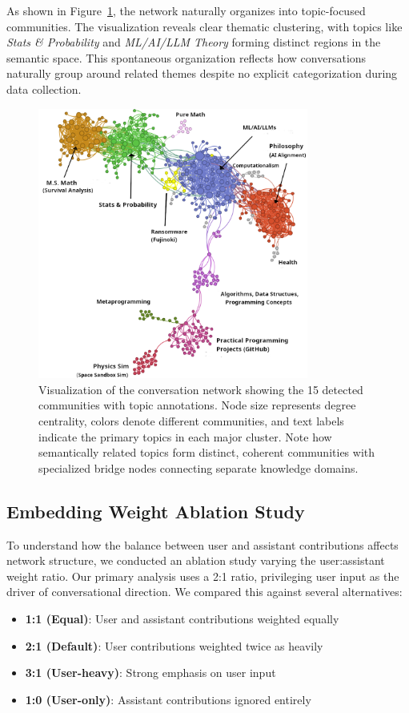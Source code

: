 \documentclass[10pt, a4paper]{article}
\begin{document}
As shown in Figure~\ref{fig:network_vis}, the network naturally organizes into topic-focused communities. The visualization reveals clear thematic clustering, with topics like \emph{Stats \& Probability} and \emph{ML/AI/LLM Theory} forming distinct regions in the semantic space. This spontaneous organization reflects how conversations naturally group around related themes despite no explicit categorization during data collection.

\begin{figure}
    \centering
    \includegraphics[width=3.5in]{./images/cluster-vis-topics-better.png}
    \caption{Visualization of the conversation network showing the 15 detected communities with topic annotations. Node size represents degree centrality, colors denote different communities, and text labels indicate the primary topics in each major cluster. Note how semantically related topics form distinct, coherent communities with specialized bridge nodes connecting separate knowledge domains.}
    \label{fig:network_vis}
\end{figure}   


\subsection{Embedding Weight Ablation Study}

To understand how the balance between user and assistant contributions affects network structure, we conducted an ablation study varying the user:assistant weight ratio. Our primary analysis uses a 2:1 ratio, privileging user input as the driver of conversational direction. We compared this against several alternatives:

\begin{itemize}
    \item \textbf{1:1 (Equal)}: User and assistant contributions weighted equally
    \item \textbf{2:1 (Default)}: User contributions weighted twice as heavily
    \item \textbf{3:1 (User-heavy)}: Strong emphasis on user input
    \item \textbf{1:0 (User-only)}: Assistant contributions ignored entirely
\end{itemize}
\end{document}
